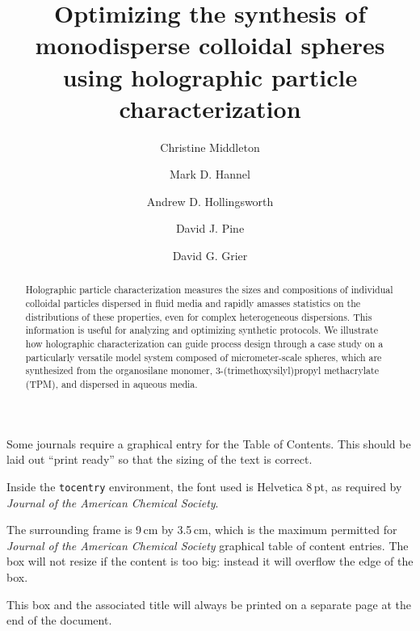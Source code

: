 \documentclass[journal=langd5,manuscript=article,layout=twocolumn]{achemso}
\author{Christine Middleton}
\author{Mark D. Hannel}
\author{Andrew D. Hollingsworth}
\author{David J. Pine}
\author{David G. Grier}
\affiliation[NYU]
{Department of Physics and Center for Soft Matter Research,
New York University, New York, NY 10003}
\title[Optimizing colloidal synthesis]
  {Optimizing the synthesis of monodisperse colloidal spheres
  using holographic particle characterization}
\begin{document}
\begin{tocentry}
Some journals require a graphical entry for the Table of Contents.
This should be laid out ``print ready'' so that the sizing of the
text is correct.

Inside the \texttt{tocentry} environment, the font used is Helvetica
8\,pt, as required by \emph{Journal of the American Chemical
Society}.

The surrounding frame is 9\,cm by 3.5\,cm, which is the maximum
permitted for  \emph{Journal of the American Chemical Society}
graphical table of content entries. The box will not resize if the
content is too big: instead it will overflow the edge of the box.

This box and the associated title will always be printed on a
separate page at the end of the document.
\end{tocentry}

\begin{abstract}
Holographic particle characterization
measures the sizes and compositions of 
individual colloidal particles dispersed in fluid media
and rapidly amasses statistics on the distributions
of these properties, even for complex heterogeneous dispersions.
This information is useful for 
analyzing and optimizing synthetic protocols.
We illustrate how holographic characterization can guide 
process design through a case study
on a particularly versatile model system
composed of micrometer-scale
spheres, which are synthesized from the 
organosilane monomer, 
3-(trimethoxysilyl)propyl methacrylate
(TPM), and dispersed in
aqueous media.
\end{abstract}
\end{document}
